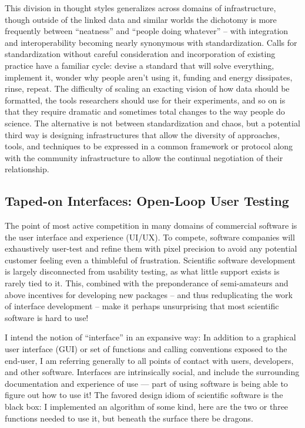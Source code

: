 This division in thought styles generalizes across domains of
infrastructure, though outside of the linked data and similar worlds the
dichotomy is more frequently between ``neatness'' and ``people doing
whatever'' -- with integration and interoperability becoming nearly
synonymous with standardization. Calls for standardization without
careful consideration and incorporation of existing practice have a
familiar cycle: devise a standard that will solve everything, implement
it, wonder why people aren't using it, funding and energy dissipates,
rinse, repeat. The
difficulty of scaling an exacting vision of how data should be
formatted, the tools researchers should use for their experiments, and
so on is that they require dramatic and sometimes total changes to the
way people do science. The alternative is not between standardization
and chaos, but a potential third way is designing infrastructures that
allow the diversity of approaches, tools, and techniques to be expressed
in a common framework or protocol along with the community
infrastructure to allow the continual negotiation of their relationship.

\hypertarget{taped-on-interfaces-open-loop-user-testing}{%
\subsection{Taped-on Interfaces: Open-Loop User
Testing}\label{taped-on-interfaces-open-loop-user-testing}}

The point of most active competition in many domains of commercial
software is the user interface and experience (UI/UX). To compete,
software companies will exhaustively user-test and refine them with
pixel precision to avoid any potential customer feeling even a
thimbleful of frustration. Scientific software development is largely
disconnected from usability testing, as what little support exists is
rarely tied to it. This, combined with the preponderance of
semi-amateurs and above incentives for developing new packages -- and
thus reduplicating the work of interface development -- make it perhaps
unsurprising that most scientific software is hard to use!

I intend the notion of ``interface'' in an expansive way: In addition to
a graphical user interface (GUI) or set of functions and calling
conventions exposed to the end-user, I am referring generally to all
points of contact with users, developers, and other software. Interfaces
are intrinsically social, and include the surrounding documentation and
experience of use --- part of using software is being able to figure out
how to use it! The favored design idiom of scientific software is the
black box: I implemented an algorithm of some kind, here are the two or
three functions needed to use it, but beneath the surface there be
dragons.

